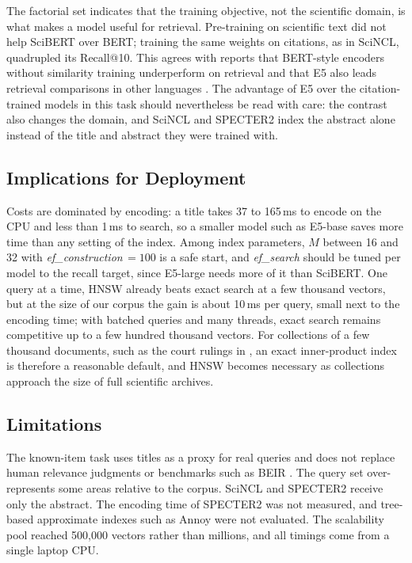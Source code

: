 \documentclass[conference, letterpaper]{IEEEtran}
\newcommand{\efc}{\textit{ef\_construction}}
\newcommand{\efs}{\textit{ef\_search}}
\begin{document}
The factorial set indicates that the training objective, not the scientific domain, is what makes a model useful for retrieval. Pre-training on scientific text did not help SciBERT over BERT; training the same weights on citations, as in SciNCL, quadrupled its Recall@10. This agrees with reports that BERT-style encoders without similarity training underperform on retrieval \cite{ajallouda2025} and that E5 also leads retrieval comparisons in other languages \cite{abdelazim2023}. The advantage of E5 over the citation-trained models in this task should nevertheless be read with care: the contrast also changes the domain, and SciNCL and SPECTER2 index the abstract alone instead of the title and abstract they were trained with.

\subsection{Implications for Deployment}

Costs are dominated by encoding: a title takes 37 to 165\,ms to encode on the CPU and less than 1\,ms to search, so a smaller model such as E5-base saves more time than any setting of the index. Among index parameters, $M$ between 16 and 32 with \efc{}$\,=100$ is a safe start, and \efs{} should be tuned per model to the recall target, since E5-large needs more of it than SciBERT. One query at a time, HNSW already beats exact search at a few thousand vectors, but at the size of our corpus the gain is about 10\,ms per query, small next to the encoding time; with batched queries and many threads, exact search remains competitive up to a few hundred thousand vectors. For collections of a few thousand documents, such as the court rulings in \cite{ibrihich2026}, an exact inner-product index is therefore a reasonable default, and HNSW becomes necessary as collections approach the size of full scientific archives.

\subsection{Limitations}

The known-item task uses titles as a proxy for real queries and does not replace human relevance judgments or benchmarks such as BEIR \cite{thakur2021}. The query set over-represents some areas relative to the corpus. SciNCL and SPECTER2 receive only the abstract. The encoding time of SPECTER2 was not measured, and tree-based approximate indexes such as Annoy were not evaluated. The scalability pool reached 500,000 vectors rather than millions, and all timings come from a single laptop CPU.
\end{document}

